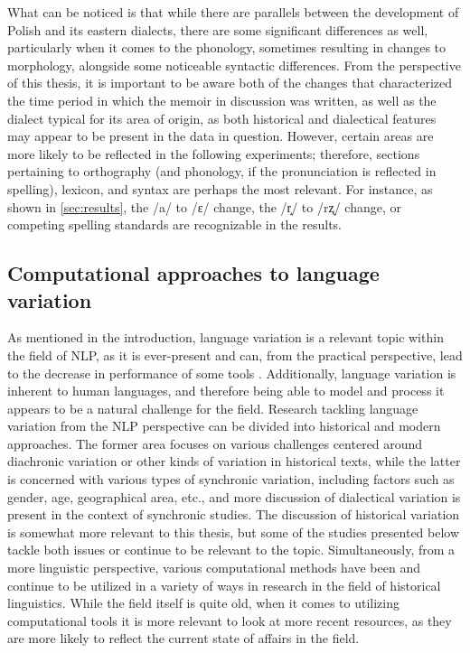What can be noticed is that while there are parallels between the development of Polish and its eastern dialects, there are some significant differences as well, particularly when it comes to the phonology, sometimes resulting in changes to morphology, alongside some noticeable syntactic differences. From the perspective of this thesis, it is important to be aware both of the changes that characterized the time period in which the memoir in discussion was written, as well as the dialect typical for its area of origin, as both historical and dialectical features may appear to be present in the data in question. However, certain areas are more likely to be reflected in the following experiments; therefore, sections pertaining to orthography (and phonology, if the pronunciation is reflected in spelling), lexicon, and syntax are perhaps the most relevant. For instance, as shown in \autoref{sec:results}, the /a/ to /ɛ/ change, the /r̝/ to /rʐ/ change, or competing spelling standards are recognizable in the results.

\subsection{Computational approaches to language variation}
\label{subsec:lang-var}

As mentioned in the introduction, language variation is a relevant topic within the field of NLP, as it is ever-present and can, from the practical perspective, lead to the decrease in performance of some tools \citep{dorn-2019-dialect, Zampieri2020NaturalLP}. Additionally, language variation is inherent to human languages, and therefore being able to model and process it appears to be a natural challenge for the field. Research tackling language variation from the NLP perspective can be divided into historical and modern approaches. The former area focuses on various challenges centered around diachronic variation or other kinds of variation in historical texts, while the latter is concerned with various types of synchronic variation, including factors such as gender, age, geographical area, etc., and more discussion of dialectical variation is present in the context of synchronic studies. The discussion of historical variation is somewhat more relevant to this thesis, but some of the studies presented below tackle both issues or continue to be relevant to the topic. Simultaneously, from a more linguistic perspective, various computational methods have been and continue to be utilized in a variety of ways in research in the field of historical linguistics. While the field itself is quite old, when it comes to utilizing computational tools it is more relevant to look at more recent resources, as they are more likely to reflect the current state of affairs in the field.


